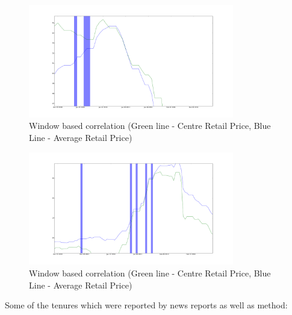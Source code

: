 \begin{itemize}
			\begin{figure}[H]
		    	\centering
  		    	\includegraphics[width=0.8\textwidth]{graphs/20110106_0108.png}
		    	\caption{Window based correlation (Green line - Centre Retail Price, Blue Line - Average Retail Price)}
		    	\label{fig:20110106_0108}
			\end{figure}

			\begin{figure}[H]
		    	\centering
  		    	\includegraphics[width=0.8\textwidth]{graphs/20121227_0105.png}
		    	\caption{Window based correlation (Green line - Centre Retail Price, Blue Line - Average Retail Price)}
		    	\label{fig:20121227_0105}
			\end{figure}
			
			Some of the tenures which were reported by news reports as well as method:
			

\end{itemize}
